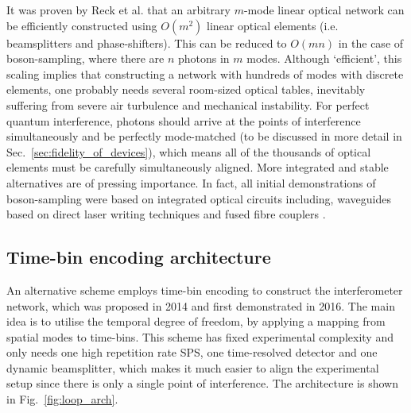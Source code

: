 \documentclass[aps,rmp,twocolumn,amsmath,amssymb,nofootinbib,superscriptaddress]{revtex4}
\begin{document}
It was proven by Reck et al. \cite{bib:18} that an arbitrary $m$-mode linear optical network can be efficiently constructed using $O(m^2)$ linear optical elements (i.e. beamsplitters and phase-shifters). This can be reduced to $O(mn)$ in the case of boson-sampling, where there are $n$ photons in $m$ modes. Although `efficient', this scaling implies that constructing a network with hundreds of modes with discrete elements, one probably needs several room-sized optical tables, inevitably suffering from severe air turbulence and mechanical instability. For perfect quantum interference, photons should arrive at the points of interference simultaneously and be perfectly mode-matched (to be discussed in more detail in Sec.~\ref{sec:fidelity_of_devices}), which means all of the thousands of optical elements must be carefully simultaneously aligned. More integrated and stable alternatives are of pressing importance. In fact, all initial demonstrations of boson-sampling were based on integrated optical circuits including, waveguides based on direct laser writing techniques \cite{bib:4, bib:5, bib:6} and fused fibre couplers \cite{bib:10}.

\subsection{Time-bin encoding architecture}

An alternative scheme employs time-bin encoding to construct the interferometer network, which was proposed \cite{bib:19} in 2014 and first demonstrated \cite{bib:11} in 2016. The main idea is to utilise the temporal degree of freedom, by applying a mapping from spatial modes to time-bins. This scheme has fixed experimental complexity and only needs one high repetition rate SPS, one time-resolved detector and one dynamic beamsplitter, which makes it much easier to align the experimental setup since there is only a single point of interference. The architecture is shown in Fig.~\ref{fig:loop_arch}.
\end{document}
